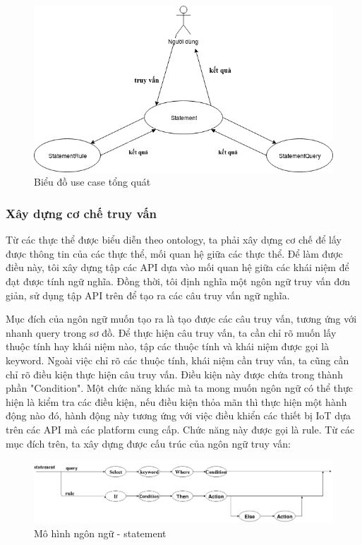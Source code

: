 \begin{figure}[h!]
	\center
	\includegraphics[scale=0.6]{image/language_diagram-use_case}
	\caption{Biểu đồ use case tổng quát}
\end{figure}

\subsubsection{Xây dựng cơ chế truy vấn}
Từ các thực thể được biểu diễn theo ontology, ta phải xây dựng cơ chế để lấy được thông tin của các thực thể, mối quan hệ giữa các thực thể. Để làm được điều này, tôi xây dựng tập các API dựa vào mối quan hệ giữa các khái niệm để đạt được tính ngữ nghĩa. Đồng thời, tôi định nghĩa một ngôn ngữ truy vấn đơn giản, sử dụng tập API trên để tạo ra các câu truy vấn ngữ nghĩa.

Mục đích của ngôn ngữ muốn tạo ra là tạo được các câu truy vấn, tương ứng với nhanh query trong sơ đồ. Để thực hiện câu truy vấn, ta cần chỉ rõ muốn lấy thuộc tính hay khái niệm nào, tập các thuộc tính và khái niệm được gọi là keyword. Ngoài việc chỉ rõ các thuộc tính, khái niệm cần truy vấn, ta cũng cần chỉ rõ điều kiện thực hiện câu truy vấn. Điều kiện này được chứa trong thành phần "Condition". Một chức năng khác mà ta mong muốn ngôn ngữ có thể thực hiện là kiểm tra các điều kiện, nếu điều kiện thỏa mãn thì thực hiện một hành động nào đó, hành động này tương ứng với việc điều khiển các thiết bị IoT dựa trên các API mà các platform cung cấp. Chức năng này được gọi là rule. 
Từ các mục đích trên, ta xây dựng được cấu trúc của ngôn ngữ truy vấn:


\begin{figure}[h!]
	\center
	\includegraphics[scale=0.3]{image/language_model-statement}
	\caption{Mô hình ngôn ngữ - statement}
\end{figure}


